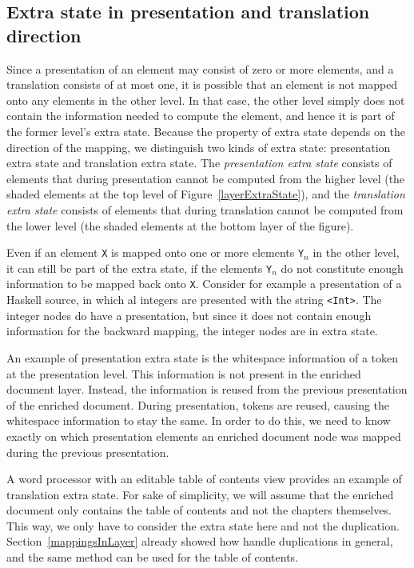 %										
%										
\subsection{Extra state in presentation and translation direction}

Since a presentation of an element may consist of zero or more elements, and a translation consists of at most one, it is possible that an element is not mapped onto any elements in the other level. In that case, the other level simply does not contain the information needed to compute the element, and hence it is part of the former level's extra state. Because the property of extra state depends on the direction of the mapping, we distinguish two kinds of extra state: presentation extra state and translation extra state. The {\em presentation extra state} consists of elements that during presentation cannot be computed from the higher level (the shaded elements at the top level of Figure~\ref{layerExtraState}), and the {\em translation extra state} consists of elements that during translation cannot be computed from the lower level (the shaded elements at the bottom layer of the figure).

Even if an element \verb|X| is mapped onto one or more elements \verb|Y|$_n$  in the other level, it can still be part of the extra state, if the elements \verb|Y|$_n$ do not constitute enough information to be mapped back onto \verb|X|. Consider for example a presentation of a Haskell source, in which al integers are presented with the string \verb|<Int>|. The integer nodes do have a presentation, but since it does not contain enough information for the backward mapping, the integer nodes are in extra state.  

An example of presentation extra state is the whitespace information of a token at the presentation level. This information is not present in the enriched document layer. Instead, the information is reused from the previous presentation of the enriched document. During presentation, tokens are reused, causing the whitespace information to stay the same. In order to do this, we need to know exactly on which presentation elements an enriched document node was mapped during the previous presentation.

A word processor with an editable table of contents view provides an example of translation extra state.  For sake of simplicity, we will assume that the enriched document only contains the table of contents and not the chapters themselves. This way, we only have to consider the extra state here and not the duplication. Section~\ref{mappingsInLayer} already showed how handle duplications in general, and the same method can be used for the table of contents. 

